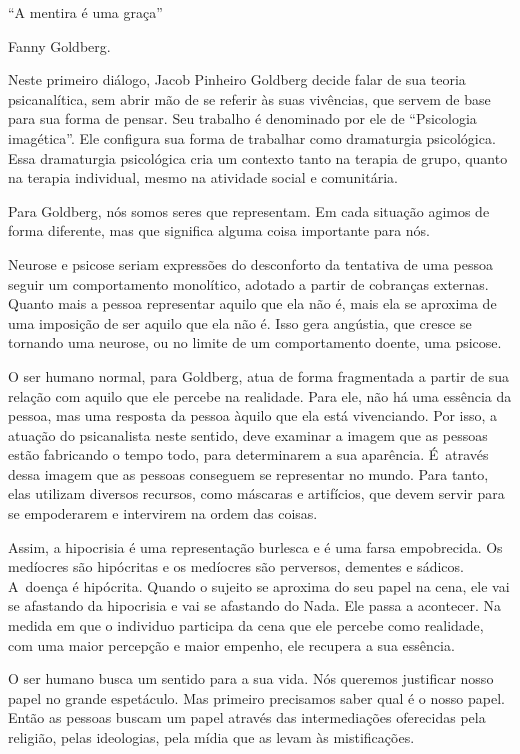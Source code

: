 \newcommand\abrefala{\begingroup\parindent0pt \setlength{\parskip}{6pt plus 3pt}}
\newcommand\fechafala{\endgroup}

 \epigraph{``A mentira é uma graça''}{Fanny Goldberg.} 

 

Neste primeiro diálogo, Jacob Pinheiro Goldberg decide falar de sua
teoria psicanalítica, sem abrir mão de se referir às suas vivências, que
servem de base para sua forma de pensar. Seu trabalho é denominado por
ele de ``Psicologia imagética''. Ele configura sua forma de trabalhar como
dramaturgia psicológica. Essa dramaturgia psicológica cria um contexto
tanto na terapia de grupo, quanto na terapia individual, mesmo na
atividade social e comunitária.

Para Goldberg, nós somos seres que representam. Em cada situação agimos
de forma diferente, mas que significa alguma coisa importante para nós.

Neurose e psicose seriam expressões do desconforto da tentativa de uma
pessoa seguir um comportamento monolítico, adotado a partir de cobranças
externas. Quanto mais a pessoa representar aquilo que ela não é, mais
ela se aproxima de uma imposição de ser aquilo que ela não é. Isso gera
angústia, que cresce se tornando uma neurose, ou no limite de um
comportamento doente, uma psicose.

O ser humano normal, para Goldberg, atua de forma fragmentada a partir
de sua relação com aquilo que ele percebe na realidade. Para ele, não há
uma essência da pessoa, mas uma resposta da pessoa àquilo que ela está
vivenciando. Por isso, a atuação do psicanalista neste sentido, deve
examinar a imagem que as pessoas estão fabricando o tempo todo, para
determinarem a sua aparência. É~através dessa imagem que as pessoas
conseguem se representar no mundo. Para tanto, elas utilizam diversos
recursos, como máscaras e artifícios, que devem servir para se
empoderarem e intervirem na ordem das coisas.

Assim, a hipocrisia é uma representação burlesca e é uma farsa
empobrecida. Os medíocres são hipócritas e os medíocres são perversos,
dementes e sádicos. A~doença é hipócrita. Quando o sujeito se aproxima
do seu papel na cena, ele vai se afastando da hipocrisia e vai se
afastando do Nada. Ele passa a acontecer. Na medida em que o individuo
participa da cena que ele percebe como realidade, com uma maior
percepção e maior empenho, ele recupera a sua essência.

O ser humano busca um sentido para a sua vida. Nós queremos justificar
nosso papel no grande espetáculo. Mas primeiro precisamos saber qual é o
nosso papel. Então as pessoas buscam um papel através das intermediações
oferecidas pela religião, pelas ideologias, pela mídia que as levam às
mistificações.

